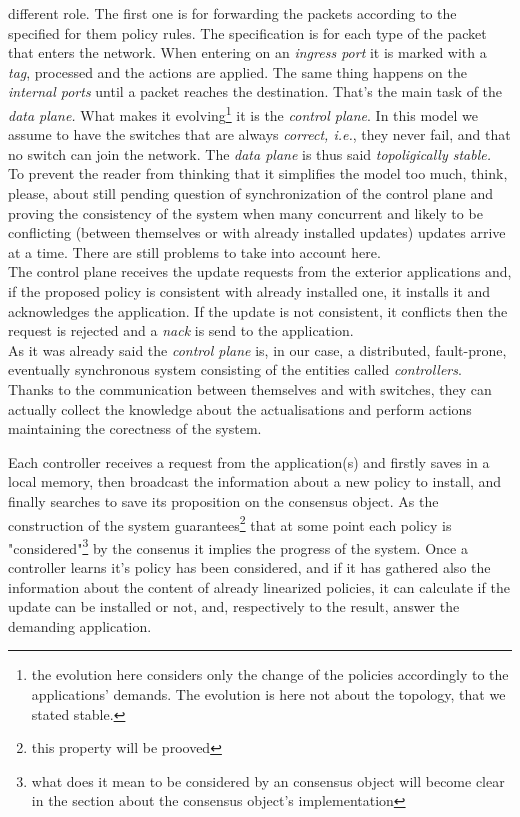 \documentclass{article}
\theoremstyle{remark}
\begin{document}
different role. 
The first one is for forwarding the packets according to the specified for them policy rules. The specification is for each type of the packet that enters the network. When entering on an \emph{ingress port} it is marked with a \emph{tag}, processed and the actions are applied. The same thing happens on the \emph{internal ports} until a packet reaches the destination. That's the main task of the \emph{data plane.} What makes it evolving\footnote{the evolution here considers only the change of the policies accordingly to the applications' demands. The evolution is here not about the topology, that we stated stable.} it is the \emph{control plane}. In this model we assume to have the switches that are always \emph{correct, i.e.}, they never fail, and that no switch can join the network. The \emph{data plane} is thus said \emph{topoligically stable.}\\
To prevent the reader from thinking that it simplifies the model too much, think, please, about still pending question of synchronization of the control plane and proving the consistency of the system when many concurrent and likely to be conflicting (between themselves or with already installed updates) updates arrive at a time. There are still problems to take into account here.\\
The control plane receives the update requests from the exterior applications and, if the proposed policy is consistent with already installed one, it installs it and acknowledges the application. If the update is not consistent, it conflicts then the request is rejected and a \emph{nack} is send to the application. \\
As it was already said the \emph{control plane} is, in our case, a distributed, fault-prone, eventually synchronous system consisting of the entities called \emph{controllers}. Thanks to the communication between themselves and with switches, they can actually collect the knowledge about the actualisations and perform actions maintaining the corectness of the system. 


Each controller receives a request from the application(s) and firstly saves in a local memory, then broadcast the information about a new policy to install, and finally searches to save its proposition on the consensus object. As the construction of the system guarantees\footnote{this property will be prooved} that at some point each policy is "considered"\footnote{what does it mean to be considered by an consensus object will become clear in the section about the consensus object's implementation} by the consenus it implies the progress of the system. Once a controller learns it's policy has been considered, and if it has gathered also the information about the content of already linearized policies, it can calculate if the  update can be installed  or not, and, respectively to the result, answer the demanding application.  \\
\end{document}

